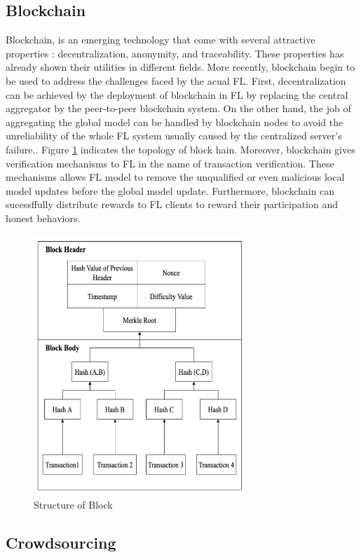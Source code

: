\documentclass{article}
\begin{document}
\subsection{Blockchain}
Blockchain, is an emerging technology that come with several attractive properties : decentralization, anonymity, and traceability. These properties has already shown their utilities in different fields. More recently, blockchain begin to be used to address the challenges faced by the acual FL. First, decentralization can be achieved by the deployment of blockchain in FL by replacing the central aggregator by the peer-to-peer blockchain system. On the other hand,  the job of aggregating the global model can be handled by blockchain nodes to avoid the unreliability of the whole FL system usually caused by the centralized server's failure.. Figure \ref{fig:TopologyBC} indicates the topology of block hain. Moreover, blockchain gives verification mechanisms to FL in the name of transaction verification. These mechanisms allows FL model to remove the unqualified or even malicious local model updates before the global model update. Furthermore, blockchain can sucessffully distribute rewards to FL clients to reward their participation and honest behaviors.
\begin{figure}[!ht]
    \centering
    \includegraphics[width=8cm]{assets/topologyBC.PNG}
    \caption{Structure of Block}
    \label{fig:TopologyBC}
\end{figure}

\subsection{Crowdsourcing}
\end{document}
